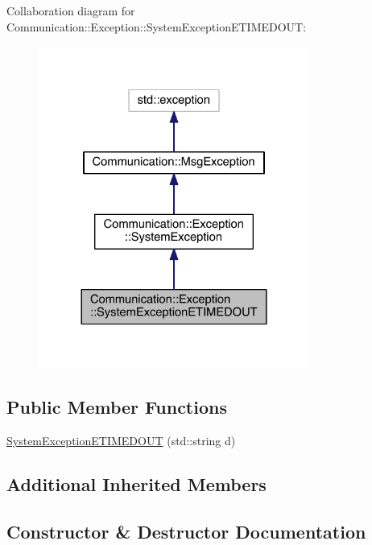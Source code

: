 Collaboration diagram for Communication\+:\+:Exception\+:\+:System\+Exception\+E\+T\+I\+M\+E\+D\+O\+U\+T\+:\nopagebreak
\begin{figure}[H]
\begin{center}
\leavevmode
\includegraphics[width=252pt]{class_communication_1_1_exception_1_1_system_exception_e_t_i_m_e_d_o_u_t__coll__graph}
\end{center}
\end{figure}
\subsection*{Public Member Functions}
\begin{DoxyCompactItemize}
\item 
\hyperlink{class_communication_1_1_exception_1_1_system_exception_e_t_i_m_e_d_o_u_t_ad10c50fa5912fb473d4490c39b0d16f8}{System\+Exception\+E\+T\+I\+M\+E\+D\+O\+U\+T} (std\+::string d)
\end{DoxyCompactItemize}
\subsection*{Additional Inherited Members}


\subsection{Constructor \& Destructor Documentation}
\hypertarget{class_communication_1_1_exception_1_1_system_exception_e_t_i_m_e_d_o_u_t_ad10c50fa5912fb473d4490c39b0d16f8}{}

